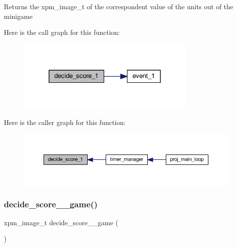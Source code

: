 \begin{DoxyReturn}{Returns}
the xpm\+\_\+image\+\_\+t of the correspondent value of the units out of the minigame 
\end{DoxyReturn}
Here is the call graph for this function\+:
\nopagebreak
\begin{figure}[H]
\begin{center}
\leavevmode
\includegraphics[width=252pt]{group__loading__xpms_ga49c14da168cc130190ad4808e0c889bf_cgraph}
\end{center}
\end{figure}
Here is the caller graph for this function\+:
\nopagebreak
\begin{figure}[H]
\begin{center}
\leavevmode
\includegraphics[width=350pt]{group__loading__xpms_ga49c14da168cc130190ad4808e0c889bf_icgraph}
\end{center}
\end{figure}
\mbox{\label{group__loading__xpms_ga5808a0af7a81c9213427d1173ea4bfdb}} 
\subsubsection{\texorpdfstring{decide\+\_\+score\+\_\+\_\+game()}{decide\_score\_1\_game()}}
{\footnotesize\ttfamily xpm\+\_\+image\+\_\+t decide\+\_\+score\+\_\+\_\+game (\begin{DoxyParamCaption}{ }\end{DoxyParamCaption})}



